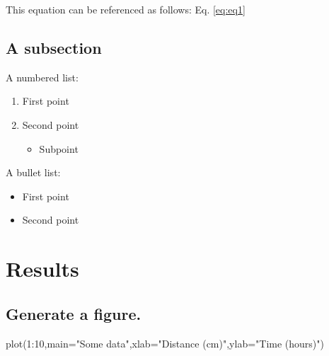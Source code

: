\documentclass[12pt,halfline,a4paper,]{ouparticle}
\newenvironment{Shaded}{\begin{snugshade}}{\end{snugshade}}
\newcommand{\AttributeTok}[1]{\textcolor[rgb]{0.77,0.63,0.00}{#1}}
\newcommand{\DecValTok}[1]{\textcolor[rgb]{0.00,0.00,0.81}{#1}}
\newcommand{\FunctionTok}[1]{\textcolor[rgb]{0.00,0.00,0.00}{#1}}
\newcommand{\NormalTok}[1]{#1}
\newcommand{\SpecialCharTok}[1]{\textcolor[rgb]{0.00,0.00,0.00}{#1}}
\newcommand{\StringTok}[1]{\textcolor[rgb]{0.31,0.60,0.02}{#1}}
\providecommand{\tightlist}{%
  \setlength{\itemsep}{0pt}\setlength{\parskip}{0pt}}
\begin{document}
This equation can be referenced as follows: Eq. \ref{eq:eq1}

\hypertarget{a-subsection}{%
\subsection{A subsection}\label{a-subsection}}

A numbered list:

\begin{enumerate}
\def\labelenumi{\arabic{enumi})}
\tightlist
\item
  First point
\item
  Second point

  \begin{itemize}
  \tightlist
  \item
    Subpoint
  \end{itemize}
\end{enumerate}

A bullet list:

\begin{itemize}
\tightlist
\item
  First point
\item
  Second point
\end{itemize}

\hypertarget{results}{%
\section{Results}\label{results}}

\hypertarget{generate-a-figure.}{%
\subsection{Generate a figure.}\label{generate-a-figure.}}

\begin{Shaded}
\begin{Highlighting}[]
\FunctionTok{plot}\NormalTok{(}\DecValTok{1}\SpecialCharTok{:}\DecValTok{10}\NormalTok{,}\AttributeTok{main=}\StringTok{"Some data"}\NormalTok{,}\AttributeTok{xlab=}\StringTok{"Distance (cm)"}\NormalTok{,}\AttributeTok{ylab=}\StringTok{"Time (hours)"}\NormalTok{)}
\end{Highlighting}
\end{Shaded}
\end{document}
